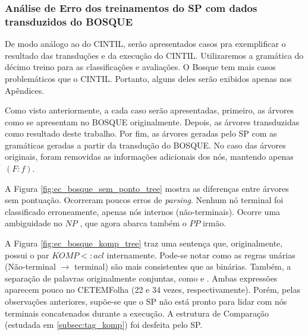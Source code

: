 \subsubsection{Análise de Erro dos treinamentos do SP com dados transduzidos do BOSQUE}
\label{subsec:ec-bosque}

De modo análogo ao do CINTIL, serão apresentados casos pra exemplificar o resultado das transduções e da execução do CINTIL. Utilizaremos a gramática do décimo treino para as classificações e avaliações. O Bosque tem mais casos problemáticos que o CINTIL. Portanto, alguns deles serão exibidos apenas nos Apêndices.

Como visto anteriormente, a cada caso serão apresentadas, primeiro, as árvores como se apresentam no BOSQUE originalmente. Depois, as árvores transduzidas como resultado deste trabalho. Por fim, as árvores geradas pelo SP com as gramáticas geradas a partir da transdução do BOSQUE. No caso das árvores originais, foram removidas as informações adicionais dos nós, mantendo apenas $(F:f)$.
\begin{center}
    
\end{center}

A Figura \ref{fig:ec_bosque_sem_ponto_tree} mostra as diferenças entre árvores sem pontuação. 
Ocorreram poucos erros de \textit{parsing}. Nenhum nó terminal foi classificado erroneamente, apenas nós internos (não-terminais). Ocorre uma ambiguidade no $NP$ , que agora abarca também o $PP$ irmão. 

\begin{center}
    
\end{center}

A Figura \ref{fig:ec_bosque_komp_tree} traz uma sentença que, originalmente, possui o par $KOMP<:acl$ internamente. Pode-se notar como as regras unárias (Não-terminal $\rightarrow$ terminal) são mais consistentes que as binárias. Também, a separação de palavras originalmente conjuntas, como  e . Ambas expressões aparecem pouco no CETEMFolha (22 e 34 vezes, respectivamente). Porém, pelas observações anteriores, supõe-se que o SP não está pronto para lidar com nós terminais concatenados durante a execução. 
A estrutura de Comparação (estudada em \ref{subsec:tag_komp}) foi desfeita pelo SP.

\begin{center}
    
\end{center}

